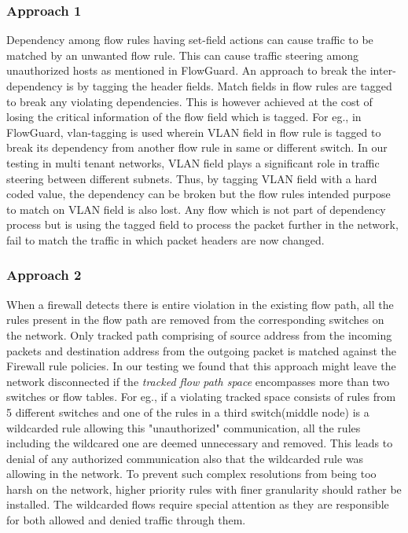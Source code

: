 \subsubsection{Approach 1}
Dependency among flow rules having set-field actions can cause traffic to be matched by an unwanted flow rule. This can cause traffic steering among unauthorized hosts as mentioned in FlowGuard. An approach to break the inter-dependency is by tagging the header fields. Match fields in flow rules are tagged to break any violating dependencies. This is however achieved at the cost of losing the critical information of the flow field which is tagged. For eg., in FlowGuard, vlan-tagging is used wherein VLAN field in flow rule is tagged to break its dependency from another flow rule in same or different switch. In our testing in multi tenant networks, VLAN field plays a significant role in traffic steering between different subnets. Thus, by tagging VLAN field with a hard coded value, the dependency can be broken but the flow rules intended purpose to match on VLAN field is also lost. Any flow which is not part of dependency process but is using the tagged field to process the packet further in the network, fail to match the traffic in which packet headers are now changed. 
\subsubsection{Approach 2}
When a firewall detects there is entire violation in the existing flow path, all the rules present in the flow path are removed from the corresponding switches on the network\cite{FLOWGUARD}. Only tracked path comprising of source address from the incoming packets and destination address from the outgoing packet is matched against the Firewall rule policies. In our testing we found that this approach might leave the network disconnected if the  \textit{tracked flow path space} encompasses more than two switches or flow tables. For eg., if a violating tracked space consists of rules from 5 different switches and one of the rules in a third switch(middle node) is a wildcarded rule allowing this "unauthorized" communication, all the rules including the wildcared one are deemed unnecessary and removed. This leads to denial of any authorized communication also that the wildcarded rule was allowing in the network.
To prevent such complex resolutions from being too harsh on the network, higher priority rules with finer granularity should rather be installed. The wildcarded flows require special attention as they are responsible for both allowed and denied traffic through them.
